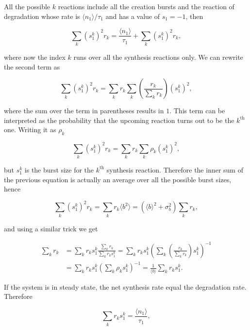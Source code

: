 All the possible $k$ reactions include all the creation bursts and the reaction of degradation whose rate is $\langle n_1 \rangle/\tau_1$ and has a value of $s_1=-1$, then

\begin{equation}
  \label{eq:mrnab2}
  \sum_k(s_1^k)^2r_k = \frac{\langle n_1 \rangle}{\tau_1} + \sum_{k}(s_1^{k})^2r_{k},
\end{equation}

where now the index $k$ runs over all the synthesis reactions only. We can rewrite the second term as

\begin{equation*}
  \sum_k(s_1^k)^2r_k=\sum_kr_k\sum_k\left(\frac{r_k}{\sum_kr_k}\right)(s_1^k)^2,
\end{equation*}

where the sum over the term in parentheses results in $1$. This term can be interpreted as the probability that the upcoming reaction turns out to be the $k^{\text{th}}$ one. Writing it as $\rho_k$

\begin{equation*}
  \sum_k(s_1^k)^2r_k=\sum_kr_k\sum_k\rho_k(s_1^k)^2,
\end{equation*}

but $s_1^k$ is the burst size for the $k^{\text{th}}$ synthesis reaction. Therefore the inner sum of the previous equation is actually an average over all the possible burst sizes, hence

\begin{equation}
  \label{eq:mrnab4}
  \sum_k(s_1^k)^2r_k=\sum_kr_k\langle b^2 \rangle=\left(\langle b\rangle^2+\sigma_b^2\right)\sum_kr_k,
\end{equation}

and using a similar trick we get

\begin{equation*}
  \begin{split}
    \sum_kr_k&=\sum_kr_ks_1^k\frac{\sum_kr_k}{\sum_kr_ks_1^k}=\sum_kr_ks_1^k\left(\sum_k\left(\frac{r_k}{\sum_kr_k}\right)s_1^k\right)^{-1}\\
    &=\sum_kr_ks_1^k\left(\sum_k\rho_ks_1^k\right)^{-1}=\frac{1}{\langle b\rangle}\sum_kr_ks_1^k.
  \end{split}
\end{equation*}

If the system is in steady state, the net synthesis rate equal the degradation rate. Therefore

\begin{equation*}
  \sum_kr_ks_1^k = \frac{\langle n_1\rangle}{\tau_1},
\end{equation*}

